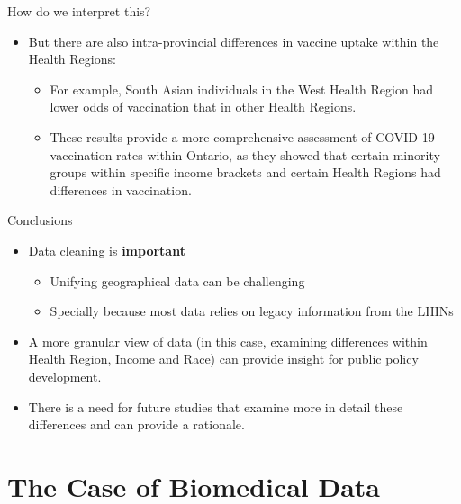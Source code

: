 \documentclass[
  ignorenonframetext,
]{beamer}
\providecommand{\tightlist}{%
  \setlength{\itemsep}{0pt}\setlength{\parskip}{0pt}}\usepackage{longtable,booktabs,array}
\begin{document}
\begin{frame}{How do we interpret this?}
\protect\hypertarget{how-do-we-interpret-this-1}{}
\begin{itemize}[<+->]
\item
  But there are also intra-provincial differences in vaccine uptake
  within the Health Regions:

  \begin{itemize}[<+->]
  \item
    For example, South Asian individuals in the West Health Region had
    lower odds of vaccination that in other Health Regions.
  \item
    These results provide a more comprehensive assessment of COVID-19
    vaccination rates within Ontario, as they showed that certain
    minority groups within specific income brackets and certain Health
    Regions had differences in vaccination.
  \end{itemize}
\end{itemize}
\end{frame}

\begin{frame}{Conclusions}
\protect\hypertarget{conclusions}{}
\begin{itemize}[<+->]
\item
  Data cleaning is \textbf{important}

  \begin{itemize}[<+->]
  \tightlist
  \item
    Unifying geographical data can be challenging
  \item
    Specially because most data relies on legacy information from the
    LHINs
  \end{itemize}
\item
  A more granular view of data (in this case, examining differences
  within Health Region, Income and Race) can provide insight for public
  policy development.
\item
  There is a need for future studies that examine more in detail these
  differences and can provide a rationale.
\end{itemize}
\end{frame}

\hypertarget{the-case-of-biomedical-data}{%
\section{The Case of Biomedical
Data}\label{the-case-of-biomedical-data}}
\end{document}

